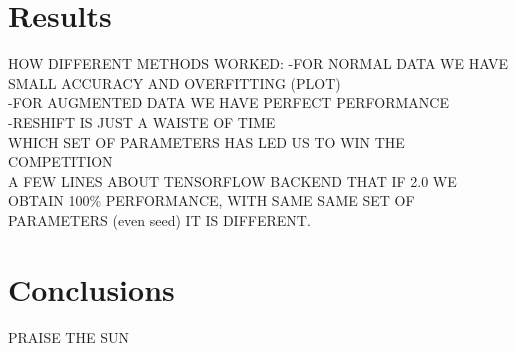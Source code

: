 \documentclass[prl,twocolumn]{revtex4-1}
\begin{document}
\section{Results}

HOW DIFFERENT METHODS WORKED:
-FOR NORMAL DATA WE HAVE SMALL ACCURACY AND OVERFITTING (PLOT)\\
-FOR AUGMENTED DATA WE HAVE PERFECT PERFORMANCE\\
-RESHIFT IS JUST A WAISTE OF TIME\\

WHICH SET OF PARAMETERS HAS LED US TO WIN THE COMPETITION\\

A FEW LINES ABOUT TENSORFLOW BACKEND THAT IF 2.0 WE OBTAIN 100\% PERFORMANCE, WITH SAME SAME SET OF PARAMETERS (even seed) IT IS DIFFERENT. \\


\section{Conclusions}

PRAISE THE SUN

  





\begin{thebibliography}{99}


  
\end{thebibliography}
\end{document}
